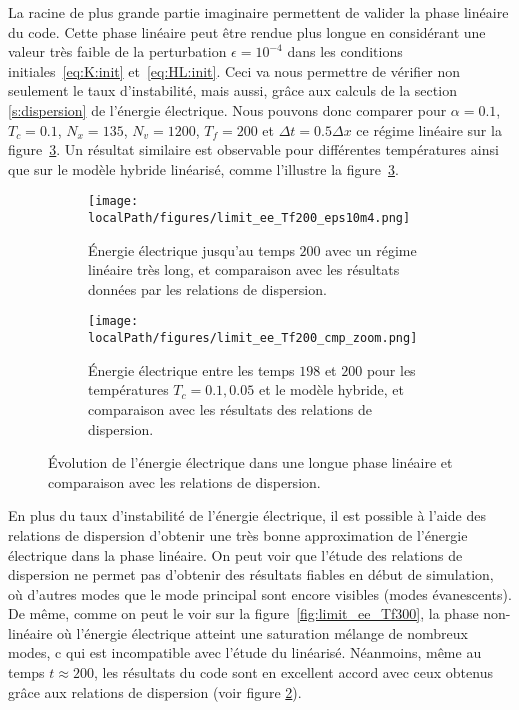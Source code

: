 La racine de plus grande partie imaginaire permettent de valider la phase linéaire du code. Cette phase linéaire peut être rendue plus longue en considérant une valeur très faible de la perturbation $\epsilon=10^{-4}$ dans les conditions initiales~\eqref{eq:K:init} et~\eqref{eq:HL:init}. Ceci va nous permettre de vérifier non seulement le taux d'instabilité, mais aussi, grâce aux calculs de la section \ref{s:dispersion} de l'énergie électrique. Nous pouvons donc comparer pour $\alpha = 0.1$, $T_c=0.1$, $N_x=135$, $N_v=1200$, $T_f=200$ et $\Delta t = 0.5\Delta x$ ce régime linéaire sur la figure~\ref{fig:limit:ee:Tf200}. Un résultat similaire est observable pour différentes températures ainsi que sur le modèle hybride linéarisé, comme l'illustre la figure~\ref{fig:limit:ee:Tf200}. 
\begin{figure}
  \centering
  \begin{subfigure}{0.8\textwidth}
    \centering
    \texttt{[image: \\localPath/figures/limit\_ee\_Tf200\_eps10m4.png]}
    \caption{Énergie électrique jusqu'au temps $200$ avec un régime linéaire très long, et comparaison avec les résultats données par les relations de dispersion.}
    \label{fig:limit:ee:Tf200:eps10m4}
  \end{subfigure}
  \begin{subfigure}{0.8\textwidth}
    \centering
    \texttt{[image: \\localPath/figures/limit\_ee\_Tf200\_cmp\_zoom.png]}
    \caption{Énergie électrique entre les temps $198$ et $200$ pour les températures $T_c = 0.1,0.05$ et le modèle hybride, et comparaison avec les résultats des relations de dispersion.}
    \label{fig:limit:ee:Tf200:cmp_zoom}
  \end{subfigure}
  \caption{Évolution de l'énergie électrique dans une longue phase linéaire et comparaison avec les relations de dispersion.}
  \label{fig:limit:ee:Tf200}
\end{figure}
En plus du taux d'instabilité de l'énergie électrique, il est possible à l'aide des relations de dispersion d'obtenir une très bonne approximation de l'énergie électrique dans la phase linéaire. On peut voir que l'étude des relations de dispersion ne permet pas d'obtenir des résultats fiables en début de simulation, où d'autres modes que le mode principal sont encore visibles (modes évanescents). De même, comme on peut le voir sur la figure~\ref{fig:limit_ee_Tf300}, la phase non-linéaire où l'énergie électrique atteint une saturation mélange de nombreux modes, c qui est incompatible avec l'étude du linéarisé. Néanmoins, même au temps $t\approx 200$, les résultats du code sont en excellent accord avec ceux obtenus grâce aux relations de dispersion  (voir figure \ref{fig:limit:ee:Tf200:cmp_zoom}). 

